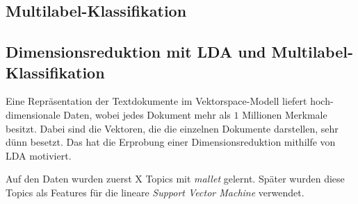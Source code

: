 
\subsection{Multilabel-Klassifikation}

\subsection{Dimensionsreduktion mit LDA und Multilabel-Klassifikation}

Eine Repräsentation der Textdokumente im Vektorspace-Modell liefert hoch-dimensionale Daten, wobei jedes Dokument mehr als $1$ Millionen Merkmale besitzt.
Dabei sind die Vektoren, die die einzelnen Dokumente darstellen, sehr dünn besetzt.
Das hat die Erprobung einer Dimensionsreduktion mithilfe von LDA motiviert.

Auf den Daten wurden zuerst X Topics mit \emph{mallet} \cite{McCallumMALLET} gelernt.
Später wurden diese Topics als Features für die lineare \emph{Support Vector Machine} verwendet.



